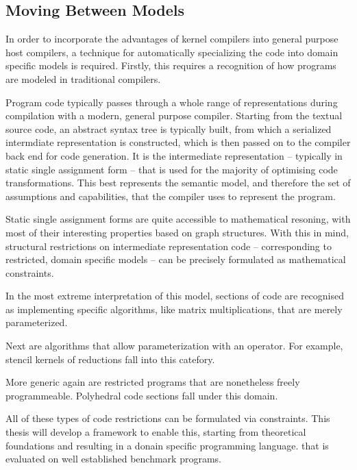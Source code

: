 \subsection*{Moving Between Models}

    In order to incorporate the advantages of kernel compilers into general
    purpose host compilers, a technique for automatically specializing the code
    into domain specific models is required.
    Firstly, this requires a recognition of how programs are modeled in
    traditional compilers.

    Program code typically passes through a whole range of representations
    during compilation with a modern, general purpose compiler.
    Starting from the textual source code, an abstract syntax tree is typically
    built, from which a serialized intermdiate representation is constructed,
    which is then passed on to the compiler back end for code generation.
    It is the intermediate representation -- typically in static single
    assignment form -- that is used for the majority of optimising code
    transformations.
    This best represents the semantic model, and therefore the set of
    assumptions and capabilities, that the compiler uses to represent the
    program.

    Static single assignment forms are quite accessible to mathematical
    resoning, with most of their interesting properties based on graph
    structures.
    With this in mind, structural restrictions on intermediate representation
    code -- corresponding to restricted, domain specific models -- can be
    precisely formulated as mathematical constraints.
    
    

    In the most extreme interpretation of this model, sections of code are
    recognised as implementing specific algorithms, like matrix multiplications,
    that are merely parameterized.

    Next are algorithms that allow parameterization with an operator.
    For example, stencil kernels of reductions fall into this catefory.

    More generic again are restricted programs that are nonetheless freely
    programmeable.
    Polyhedral code sections fall under this domain.

    All of these types of code restrictions can be formulated via constraints.
    This thesis will develop a framework to enable this, starting from
    theoretical foundations and resulting in a donain specific programming
    language. that is evaluated on well established benchmark programs.


